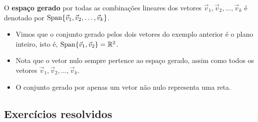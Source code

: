 \documentclass[../livro.tex]{subfiles}  %
\begin{document}
O \textbf{espaço gerado} por todas as combinações lineares dos vetores $\vec{v}_1, \vec{v}_2, \dots, \vec{v}_k$ é denotado por $\operatorname{Span} \{ \vec{v}_1, \vec{v}_2, \dots, \vec{v}_k \}$.

\begin{itemize}
\item Vimos que o conjunto gerado pelos dois vetores do exemplo anterior é o plano inteiro, isto é, $\operatorname{Span} \{ \vec{v}_1, \vec{v}_2 \} = \mathbb{R}^2$.
\item Nota que o vetor nulo sempre pertence ao espaço gerado, assim como todos os vetores $\vec{v}_1, \vec{v}_2, \dots, \vec{v}_k$.
\item O conjunto gerado por apenas um vetor não nulo representa uma reta.
\end{itemize}

\subsection*{Exercícios resolvidos}

\construirExeresol
\end{document}
